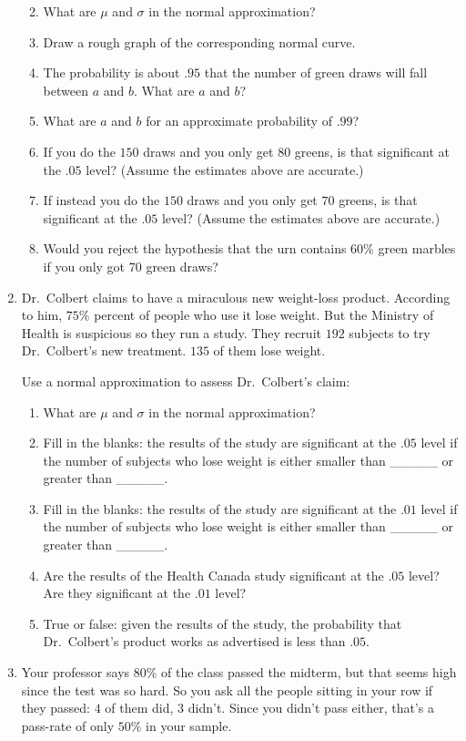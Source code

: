 \documentclass[justified]{tufte-book}
\providecommand{\tightlist}{%
  \setlength{\itemsep}{0pt}\setlength{\parskip}{0pt}}
\theoremstyle{definition}
\theoremstyle{definition}
\theoremstyle{definition}
\theoremstyle{remark}
\begin{document}
\begin{enumerate}
  \begin{enumerate}
  \def\labelenumii{\alph{enumii}.}
  \tightlist
  \item
    What are \(\mu\) and \(\sigma\) in the normal approximation?
  \item
    Draw a rough graph of the corresponding normal curve.
  \item
    The probability is about \(.95\) that the number of green draws will
    fall between \(a\) and \(b\). What are \(a\) and \(b\)?
  \item
    What are \(a\) and \(b\) for an approximate probability of \(.99\)?
  \item
    If you do the \(150\) draws and you only get \(80\) greens, is that
    significant at the \(.05\) level? (Assume the estimates above are
    accurate.)
  \item
    If instead you do the \(150\) draws and you only get \(70\) greens,
    is that significant at the \(.05\) level? (Assume the estimates
    above are accurate.)
  \item
    Would you reject the hypothesis that the urn contains \(60\%\) green
    marbles if you only got 70 green draws?
  \end{enumerate}
\item
  Dr.~Colbert claims to have a miraculous new weight-loss product.
  According to him, \(75\%\) percent of people who use it lose weight.
  But the Ministry of Health is suspicious so they run a study. They
  recruit \(192\) subjects to try Dr.~Colbert's new treatment. \(135\)
  of them lose weight.

  Use a normal approximation to assess Dr.~Colbert's claim:

  \begin{enumerate}
  \def\labelenumii{\alph{enumii}.}
  \tightlist
  \item
    What are \(\mu\) and \(\sigma\) in the normal approximation?
  \item
    Fill in the blanks: the results of the study are significant at the
    \(.05\) level if the number of subjects who lose weight is either
    smaller than \_\_\_\_\_ or greater than \_\_\_\_\_.
  \item
    Fill in the blanks: the results of the study are significant at the
    \(.01\) level if the number of subjects who lose weight is either
    smaller than \_\_\_\_\_ or greater than \_\_\_\_\_.
  \item
    Are the results of the Health Canada study significant at the
    \(.05\) level? Are they significant at the \(.01\) level?
  \item
    True or false: given the results of the study, the probability that
    Dr.~Colbert's product works as advertised is less than \(.05\).
  \end{enumerate}
\item
  Your professor says \(80\%\) of the class passed the midterm, but that
  seems high since the test was so hard. So you ask all the people
  sitting in your row if they passed: \(4\) of them did, \(3\) didn't.
  Since you didn't pass either, that's a pass-rate of only \(50\%\) in
  your sample.


\end{enumerate}
\end{document}
